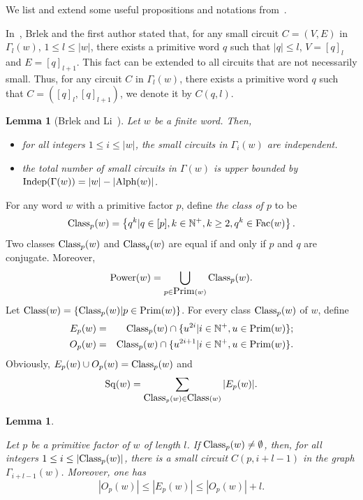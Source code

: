 \documentclass[runningheads,envcountsame,a4paper]{llncs}
\newtheorem{lem}[thm]{Lemma}
\newcommand{\Alphabet}{\hbox{\rm Alph}}
\newcommand{\fac}{\hbox{\rm Fac}}
\newcommand{\Class}{\hbox{\rm Class}}
\newcommand{\prim}{\hbox{\rm Prim}}
\newcommand{\pow}{\mathrm{Power}}
\newcommand{\sq}{\mathrm{Sq}}
\newcommand{\NN}{\mathbb{N}}
\newcommand{\indep}{\mathrm{Indep}}
\begin{document}
We list and extend some useful propositions and notations from~\cite{sum}.

In~\cite{sum}, Brlek and the first author stated that, for any small circuit $C=(V,E)$ in $\Gamma_l(w)$, $1 \leq l \leq |w|$, there exists a primitive word $q$ such that $|q| \leq l$, $V=[q]_l$ and $E=[q]_{l+1}$. This fact can be extended to all circuits that are not necessarily small. Thus, for any circuit $C$ in $\Gamma_l(w)$, there exists a primitive word $q$ such that $C=([q]_l, [q]_{l+1})$, we denote it by $C(q,l)$.


\begin{lem}[{\rm Brlek and Li~\cite{sum}}]
\label{independent}
Let $w$ be a finite word. Then, 
\begin{itemize}
    \item[1] for all integers $1\leq i\leq |w|$,  the small circuits in $\Gamma_i(w)$ are independent. 
    \item[2] the total number of small circuits in $\Gamma(w)$ is upper bounded by $\indep(\Gamma(w))=|w|-|\Alphabet(w)|$.
\end{itemize}
\end{lem}
For any word $w$ with a primitive factor $p$, define {\em the class of $p$} to be $$\Class_p(w)=\left\{q^{k}| q \in [p], k \in \NN^+, k \geq 2, q^{k} \in \fac(w) \right\}.$$
Two classes $\Class_p(w)$ and $\Class_q(w)$ are equal if and only if $p$ and $q$ are conjugate. Moreover, $$\pow(w)=\bigcup_{p\in\prim(w)}\Class_p(w).$$ 
Let $\Class(w)=\{\Class_p(w)| p \in \prim(w)\}$.
For every class  $\Class_p(w)$ of $w$, define
\begin{eqnarray*}
E_p(w)&=&\Class_p(w) \cap \{u^{2i}| i \in \mathbb{N}^+, u \in \prim(w)\};\\
O_p(w)&=&\Class_p(w) \cap \{u^{2i+1}| i \in \mathbb{N^+},  u \in \prim(w)\}.
\end{eqnarray*}
Obviously, $E_p(w) \cup O_p(w) = \Class_p(w)$ and\\ $$\sq(w)=\sum_{\Class_p(w) \in \Class(w)} |E_p(w)|.$$ 

\begin{lem}\label{odd}

Let $p$ be a primitive factor of $w$ of length $l$. If $\Class_p(w) \neq \emptyset$, then, for all integers $1 \leq i \leq |\Class_p(w)| $, there is a small circuit $C(p,i+l-1)$ in the graph $\Gamma_{i+l-1}(w)$. Moreover, one has
\begin{equation*}
|O_p(w)| \leq |E_p(w)| \leq |O_p(w)|+l.
\end{equation*}
\end {lem}
\end{document}
